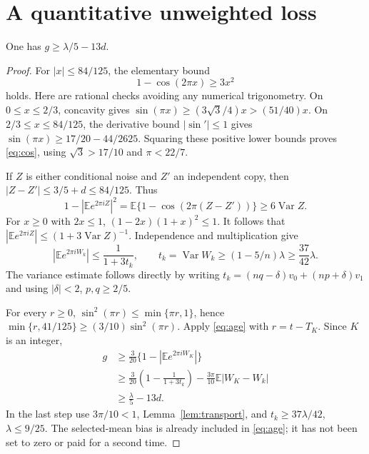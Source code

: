 \documentclass[11pt]{article}
\newcommand{\E}{\mathbb E}\newcommand{\Pp}{\mathbb P}
\begin{document}
\section{A quantitative unweighted loss}
\begin{lemma}\label{lem:cf}
One has $g\ge\lambda/5-13d$.
\end{lemma}
\begin{proof}
For $|x|\le84/125$, the elementary bound
\begin{equation}\label{eq:cos}
                         1-\cos(2\pi x)\ge3x^2
\end{equation}
holds. Here are rational checks avoiding any numerical trigonometry.
On $0\le x\le2/3$, concavity gives
$\sin(\pi x)\ge(3\sqrt3/4)x>(51/40)x$.
On $2/3\le x\le84/125$, the derivative bound $|\sin'|\le1$ gives
$\sin(\pi x)\ge17/20-44/2625$.
Squaring these positive lower bounds proves \eqref{eq:cos}, using
$\sqrt3>17/10$ and $\pi<22/7$.

If $Z$ is either conditional noise and $Z'$ an independent copy, then
$|Z-Z'|\le3/5+d\le84/125$. Thus
\[
 1-|\E e^{2\pi i Z}|^2
       =\E\{1-\cos(2\pi(Z-Z'))\}\ge6\operatorname{Var}Z.
\]
For $x\ge0$ with $2x\le1$, $(1-2x)(1+x)^2\le1$.
It follows that $|\E e^{2\pi i Z}|\le(1+3\operatorname{Var}Z)^{-1}$.
Independence and multiplication give
\[
 |\E e^{2\pi i W_k}|\le\frac1{1+3t_k},\qquad
 t_k=\operatorname{Var}W_k\ge(1-5/n)\lambda\ge\frac{37}{42}\lambda.
\]
The variance estimate follows directly by writing
$t_k=(nq-\delta)v_0+(np+\delta)v_1$ and using $|\delta|<2$,
$p,q\ge2/5$.

For every $r\ge0$, $\sin^2(\pi r)\le\min\{\pi r,1\}$, hence
$\min\{r,41/125\}\ge(3/10)\sin^2(\pi r)$.
Apply \eqref{eq:age} with $r=t-T_K$. Since $K$ is an integer,
\begin{align*}
 g&\ge\frac3{20}\{1-|\E e^{2\pi i W_K}|\}\\
  &\ge\frac3{20}\left(1-\frac1{1+3t_k}\right)
                -\frac{3\pi}{10}\E|W_K-W_k|\\
  &\ge\frac\lambda5-13d.
\end{align*}
In the last step use $3\pi/10<1$, Lemma~\ref{lem:transport}, and
$t_k\ge37\lambda/42$, $\lambda\le9/25$.
The selected-mean bias is already included in \eqref{eq:age}; it has not
been set to zero or paid for a second time.
\end{proof}
\end{document}
